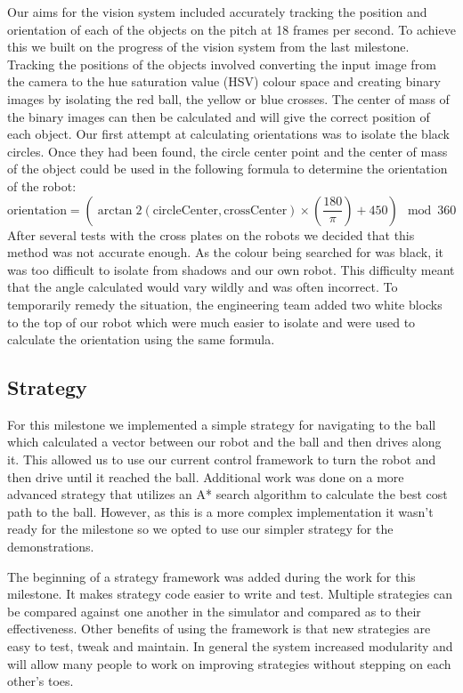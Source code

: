 \documentclass[12pt, a4paper, titlepage]{article}
\begin{document}
Our aims for the vision system included accurately tracking the position and
orientation of each of the objects on the pitch at 18 frames per second. To
achieve this we built on the progress of the vision system from the last
milestone. Tracking the positions of the objects involved converting the
input image from the camera to the hue saturation value (HSV) colour space
and creating binary images by isolating the red ball, the yellow or blue
crosses. The center of mass of the binary images can then be calculated and
will give the correct position of each object. Our first attempt at calculating
orientations was to isolate the black circles. Once they had been found, the
circle center point and the center of mass of the object could be used in the
following formula to determine the orientation of the robot: \begin{equation*}
\mbox{orientation} = (\arctan2(\mbox{circleCenter}, \mbox{crossCenter}) \times
\left(\frac{180}{\pi}\right) + 450) \mod 360 \end{equation*} After several tests
with the cross plates on the robots we decided that this method was not accurate
enough. As the colour being searched for was black, it was too difficult to
isolate from shadows and our own robot. This difficulty meant that the angle
calculated would vary wildly and was often incorrect. To temporarily remedy the
situation, the engineering team added two white blocks to the top of our robot
which were much easier to isolate and were used to calculate the orientation
using the same formula.

\subsection{Strategy}

For this milestone we implemented a simple strategy for navigating to the ball
which calculated a vector between our robot and the ball and then drives along
it. This allowed us to use our current control framework to turn the robot
and then drive until it reached the ball. Additional work was done on a more
advanced strategy that utilizes an A* search algorithm to calculate the best
cost path to the ball. However, as this is a more complex implementation it
wasn't ready for the milestone so we opted to use our simpler strategy for the
demonstrations.

The beginning of a strategy framework was added during the work for this
milestone. It makes strategy code easier to write and test. Multiple strategies
can be compared against one another in the simulator and compared as to their
effectiveness. Other benefits of using the framework is that new strategies are
easy to test, tweak and maintain. In general the system increased modularity and
will allow many people to work on improving strategies without stepping on each
other's toes.
\end{document}
